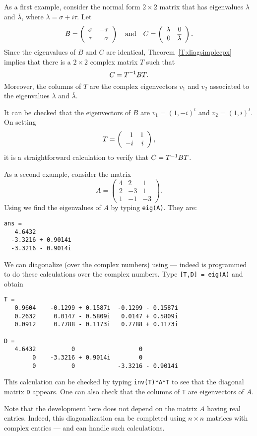 \documentclass{ximera}
\begin{document}
As a first example, consider the normal form $2\times 2$ matrix 
 that has eigenvalues $\lambda$ and $\overline{\lambda}$, 
where $\lambda=\sigma+i\tau$.   Let 
\[
B = \left(\begin{array}{rr} \sigma & -\tau\\ \tau &\sigma\end{array}\right) \quad\mbox{and}\quad 
C = \left(\begin{array}{rr} \lambda & 0\\ 0 &\overline{\lambda}\end{array}\right).
\]
Since the eigenvalues of $B$ and $C$ are identical, 
Theorem~\ref{T:diagsimplecpx} implies that there is a $2\times 2$ complex 
matrix $T$ such that
\begin{equation}  \label{E:BCsimilar}
C = T^{-1} B T.
\end{equation}
Moreover, the columns of $T$ are the complex eigenvectors $v_1$ and $v_2$
associated to the eigenvalues $\lambda$ and $\overline{\lambda}$.

It can be checked that the eigenvectors of $B$ are $v_1=(1,-i)^t$ and 
$v_2=(1,i)^t$.  On setting 
\[
T = \left(\begin{array}{rr} 1 & 1\\ -i &i\end{array}\right),
\]
it is a straightforward calculation to verify that $C=T^{-1} BT$.  


As a second example, consider the matrix 
\begin{equation*}
A = \left(\begin{array}{rrr}     4  &   2   &  1\\
     2  &  -3  &   1\\  1 &   -1  &  -3 \end{array} \right).
\end{equation*}
Using \Matlab we find the eigenvalues of $A$ by typing {\tt eig(A)}. 
They are:
\begin{verbatim}
ans =
   4.6432          
  -3.3216 + 0.9014i
  -3.3216 - 0.9014i
\end{verbatim}
We can diagonalize (over the complex numbers) using \Matlab --- indeed 
\Matlab is programmed to do these calculations over the complex numbers. 
Type {\tt [T,D] = eig(A)} and obtain
\begin{verbatim}
T =
   0.9604    -0.1299 + 0.1587i  -0.1299 - 0.1587i
   0.2632     0.0147 - 0.5809i   0.0147 + 0.5809i
   0.0912     0.7788 - 0.1173i   0.7788 + 0.1173i

D =
   4.6432          0                  0          
        0    -3.3216 + 0.9014i        0          
        0          0            -3.3216 - 0.9014i
\end{verbatim}
This calculation can be checked by typing {\tt inv(T)*A*T} to see that 
the diagonal matrix {\tt D} appears.  
One can also check that the columns of 
{\tt T} are eigenvectors of $A$.

Note that the development here does not depend on the matrix $A$ having 
real entries.  Indeed, this diagonalization can be completed using 
$n\times n$ matrices with complex entries --- and \Matlab can handle such 
calculations.
\end{document}
